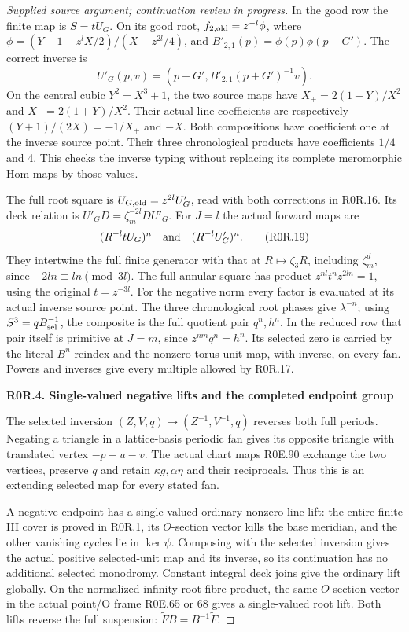 \begin{proof}[Supplied source argument; continuation review in progress]
In the good row the finite map is \(S=tU_G\). On its good root,
\(f_{2,\rm old}=z^{-l}\phi\), where
\(\phi=(Y-1-z^lX/2)/(X-z^{2l}/4)\), and
\(B'_{2,1}(p)=\phi(p)\phi(p-G')\). The correct inverse is
\[
 U'_G(p,v)=(p+G',B'_{2,1}(p+G')^{-1}v).
 \tag{R0R.18}
\]
On the central cubic \(Y^2=X^3+1\), the two source maps have
\(X_+=2(1-Y)/X^2\) and \(X_-=2(1+Y)/X^2\).
Their actual line coefficients are respectively
\((Y+1)/(2X)=-1/X_+\) and \(-X\). Both compositions have coefficient
one at the inverse source point. Their three chronological products
have coefficients \(1/4\) and 4. This checks the inverse typing
without replacing its complete meromorphic Hom maps by those values.

The full root square is \(U_{G,\rm old}=z^{2l}U'_G\), read with
both corrections in R0R.16. Its deck relation is
\(U'_GD=\zeta_m^{-2l}DU'_G\). For \(J=l\) the actual forward
maps are
\[
 (R^{-l}tU_G)^n\quad\hbox{and}\quad(R^{-l}U'_G)^n.
 \tag{R0R.19}
\]
They intertwine the full finite generator with that at
\(R\mapsto\zeta_3R\), including \(\zeta_m^d\), since
\(-2ln\equiv ln\pmod {3l}\). The full annular square has product
\(z^{nl}t^nz^{2ln}=1\), using the original \(t=z^{-3l}\).
For the negative norm every factor is evaluated at its actual inverse
source point. The three chronological root phases give
\(\lambda^{-n}\); using \(S^3=qB_{\rm sel}^{-1}\), the composite
is the full quotient pair \(q^n,h^n\). In the reduced row that pair
itself is primitive at \(J=m\), since \(z^{nm}q^n=h^n\). Its
selected zero is carried by the literal \(B^n\) reindex and the
nonzero torus-unit map, with inverse, on every fan. Powers and inverses
give every multiple allowed by R0R.17.

\par

\medskip\noindent\textbf{R0R.4. Single-valued negative lifts and the completed endpoint group}

\par\nobreak

The selected inversion \((Z,V,q)\mapsto(Z^{-1},V^{-1},q)\) reverses
both full periods. Negating a triangle in a lattice-basis periodic fan
gives its opposite triangle with translated vertex \(-p-u-v\).
The actual chart maps R0E.90 exchange the two vertices, preserve
\(q\) and retain \(\kappa g,\alpha\eta\) and their reciprocals.
Thus this is an extending selected map for every stated fan.

A negative endpoint has a single-valued ordinary nonzero-line lift:
the entire finite III cover is proved in R0R.1, its \(O\)-section
vector kills the base meridian, and the other vanishing cycles lie
in \(\ker\psi\). Composing with the selected inversion gives the
actual positive selected-unit map and its inverse, so its continuation
has no additional selected monodromy. Constant integral deck joins
give the ordinary lift globally. On the normalized infinity root
fibre product, the same \(O\)-section vector in the actual point/O
frame R0E.65 or 68 gives a single-valued root lift. Both lifts reverse
the full suspension: \(\widetilde F B=B^{-1}\widetilde F\).


\end{proof}
